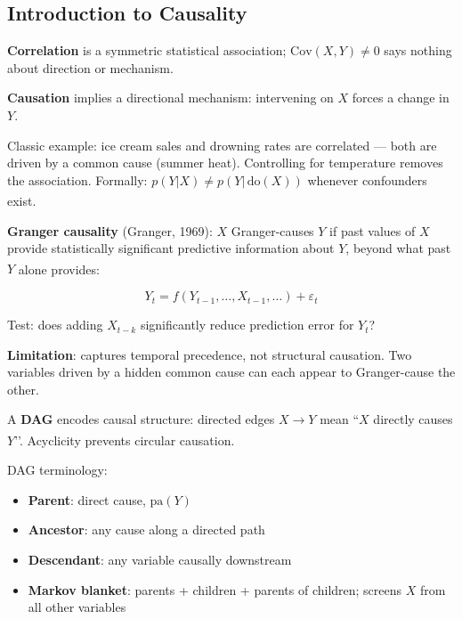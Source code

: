     \subsection{Introduction to Causality}
    \begin{tcbitemize}[ skin=sectionraster ]

    \tcbitem[title={Correlation vs Causation}, raster multicolumn=3]
    \textbf{Correlation} is a symmetric statistical association;
    $\mathrm{Cov}(X,Y) \neq 0$ says nothing about direction or mechanism.

    \textbf{Causation} implies a directional mechanism: intervening on $X$
    forces a change in $Y$.

    Classic example: ice cream sales and drowning rates are correlated ---
    both are driven by a common cause (summer heat). Controlling for
    temperature removes the association. Formally: $p(Y|X) \neq p(Y|\,\mathrm{do}(X))$
    whenever confounders
    exist.\textsuperscript{\cite[][Ch.~1]{pearlBookWhyNew2018}}

    \tcbitem[title=Granger Causality, raster multicolumn=3]
    \textbf{Granger causality} (Granger, 1969): $X$ Granger-causes $Y$ if past
    values of $X$ provide statistically significant predictive information
    about $Y$, beyond what past $Y$ alone
    provides:\textsuperscript{\cite[][Ch.~2]{nessCausalAI2025}}

    \[ Y_t = f(Y_{t-1}, \ldots, X_{t-1}, \ldots) + \varepsilon_t \]

    Test: does adding $X_{t-k}$ significantly reduce prediction error for $Y_t$?

    \textbf{Limitation}: captures temporal precedence, not structural
    causation. Two variables driven by a hidden common cause can each appear
    to Granger-cause the other.

    \tcbitem[title={Directed Acyclic Graphs (DAGs)}, raster multicolumn=3]
    A \textbf{DAG} encodes causal structure: directed edges $X \to Y$ mean
    ``$X$ directly causes $Y$’’. Acyclicity prevents circular
    causation.\textsuperscript{\cite[][pp.~25--27]{barberBayesianReasoningMachine2012}}

    DAG terminology:
    \begin{itemize}
        \item \textbf{Parent}: direct cause, $\mathrm{pa}(Y)$
        \item \textbf{Ancestor}: any cause along a directed path
        \item \textbf{Descendant}: any variable causally downstream
        \item \textbf{Markov blanket}: parents + children + parents of children;
              screens $X$ from all other variables
    \end{itemize}


\end{tcbitemize}
